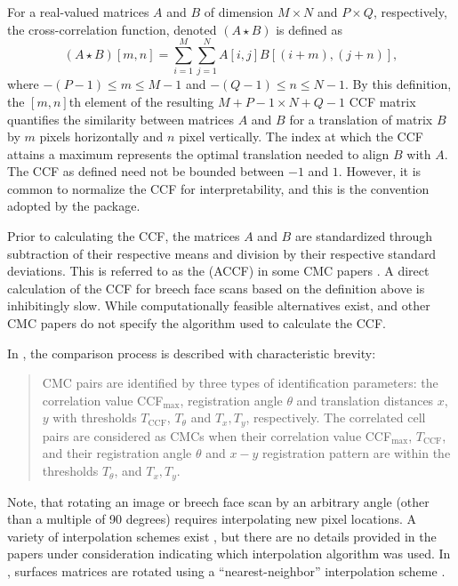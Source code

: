 For a real-valued matrices \(A\) and \(B\) of dimension \(M \times N\)
and \(P \times Q\), respectively, the cross-correlation function,
denoted \((A \star B)\) is defined as \[
(A \star B)[m,n] = \sum_{i=1}^M \sum_{j=1}^N A[i,j] B[(i + m), (j + n)],
\] where \(-(P-1) \leq m \leq M-1\) and \(-(Q-1) \leq n \leq N-1\). By
this definition, the \([m,n]\)th element of the resulting
\(M + P - 1 \times N + Q - 1\) CCF matrix quantifies the similarity
between matrices \(A\) and \(B\) for a translation of matrix \(B\) by
\(m\) pixels horizontally and \(n\) pixel vertically. The index at which
the CCF attains a maximum represents the optimal translation needed to
align \(B\) with \(A\). The CCF as defined need not be bounded between
\(-1\) and \(1\). However, it is common to normalize the CCF for
interpretability, and this is the convention adopted by the
 package.

Prior to calculating the CCF, the matrices \(A\) and \(B\) are
standardized through subtraction of their respective means and division
by their respective standard deviations. This is referred to as the
 (ACCF) in some CMC papers
\citep{ott_applying_2017}. A direct calculation of the CCF for breech
face scans based on the definition above is inhibitingly slow. While
computationally feasible alternatives exist, \citet{song_proposed_2013}
and other CMC papers do not specify the algorithm used to calculate the
CCF.

In \citet{song_3d_2014}, the comparison process is described with
characteristic brevity:

\begin{quote}
CMC pairs are identified by three types of identification parameters:
the correlation value CCF\(_{\max}\), registration angle \(\theta\) and
translation distances \(x\), \(y\) with thresholds \(T_{\text{CCF}}\),
\(T_\theta\) and \(T_x, T_y\), respectively. The correlated cell pairs
are considered as CMCs when their correlation value CCF\(_{\max}\),
\(T_{\text{CCF}}\), and their registration angle \(\theta\) and \(x-y\)
registration pattern are within the thresholds \(T_\theta\), and
\(T_x, T_y\).
\end{quote}

Note, that rotating an image or breech face scan by an arbitrary angle
(other than a multiple of 90 degrees) requires interpolating new pixel
locations. A variety of interpolation schemes exist
\citep{parker_comparison_1983}, but there are no details provided in the
papers under consideration indicating which interpolation algorithm was
used. In , surfaces matrices are rotated using a
``nearest-neighbor'' interpolation scheme \citep{imager}.

